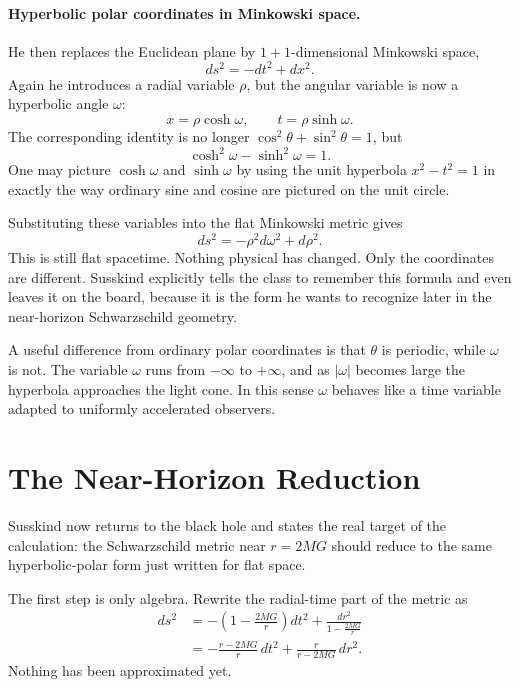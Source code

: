 \paragraph{Hyperbolic polar coordinates in Minkowski space.}
He then replaces the Euclidean plane by \(1+1\)-dimensional Minkowski space,
\begin{equation}
ds^2 = -dt^2 + dx^2.
\end{equation}
Again he introduces a radial variable \(\rho\), but the angular variable is now a hyperbolic angle \(\omega\):
\begin{equation}
x=\rho\cosh\omega,
\qquad
t=\rho\sinh\omega.
\end{equation}
The corresponding identity is no longer \(\cos^2\theta+\sin^2\theta=1\), but
\begin{equation}
\cosh^2\omega-\sinh^2\omega=1.
\end{equation}
One may picture \(\cosh\omega\) and \(\sinh\omega\) by using the unit hyperbola \(x^2-t^2=1\) in exactly the way ordinary sine and cosine are pictured on the unit circle.

Substituting these variables into the flat Minkowski metric gives
\begin{equation}
ds^2 = -\rho^2 d\omega^2 + d\rho^2.
\end{equation}
This is still flat spacetime. Nothing physical has changed. Only the coordinates are different. Susskind explicitly tells the class to remember this formula and even leaves it on the board, because it is the form he wants to recognize later in the near-horizon Schwarzschild geometry.

A useful difference from ordinary polar coordinates is that \(\theta\) is periodic, while \(\omega\) is not. The variable \(\omega\) runs from \(-\infty\) to \(+\infty\), and as \(|\omega|\) becomes large the hyperbola approaches the light cone. In this sense \(\omega\) behaves like a time variable adapted to uniformly accelerated observers.

\section{The Near-Horizon Reduction}

Susskind now returns to the black hole and states the real target of the calculation: the Schwarzschild metric near \(r=2MG\) should reduce to the same hyperbolic-polar form just written for flat space.

The first step is only algebra. Rewrite the radial-time part of the metric as
\begin{align}
ds^2
&= -\left(1-\frac{2MG}{r}\right)dt^2 + \frac{dr^2}{1-\frac{2MG}{r}} \\
&= -\frac{r-2MG}{r}\,dt^2 + \frac{r}{r-2MG}\,dr^2 .
\end{align}
Nothing has been approximated yet.

